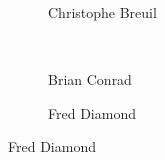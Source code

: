 \begin{frame}[plain]
\begin{figure}[h]
\begin{subfigure}{0.3\textwidth}
	\caption{\scriptsize Christophe Breuil}
	\end{subfigure}
	\\
	\begin{subfigure}{0.4\textwidth}
	\captionsetup{labelformat=empty}
	\centering
	\caption{\scriptsize Brian Conrad}
	\end{subfigure}
	\begin{subfigure}{0.4\textwidth}
	\captionsetup{labelformat=empty}
	\centering
	\caption{\scriptsize Fred Diamond}
	\end{subfigure}
	\end{figure}
\end{frame}



